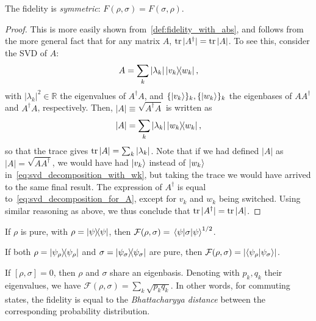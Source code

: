 \documentclass[12pt]{report}
\newcommand{\RR}{\mathbb{R}}
\newcommand{\calF}{{\mathcal{F}}}
\begin{document}
\begin{prop}
	The fidelity is \emph{symmetric}: $F(\rho,\sigma)=F(\sigma,\rho)$.
\end{prop}
\begin{proof}
	This is more easily shown from~\cref{def:fidelity_with_abs}, and follows from the more general fact that for any matrix $A$, $\tr|A^\dagger|=\tr|A|$.
	To see this, consider the \ac{SVD} of $A$:
	\begin{equation}
		A = \sum_k |\lambda_k| \ketbra{v_k}{w_k},
		\label{eq:svd_decomposition_for_A}
	\end{equation}
	with $|\lambda_k|^2\in\RR$ the eigenvalues of $A^\dagger A$, and $\{\ket{v_k}\}_k,\{\ket{w_k}\}_k$ the eigenbases of $AA^\dagger$ and $A^\dagger A$, respectively.
	Then, $|A|\equiv\sqrt{A^\dagger A}$ is written as
	\begin{equation}
		|A| = \sum_k |\lambda_k| \ketbra{w_k}{w_k},
		\label{eq:svd_decomposition_with_wk}
	\end{equation}
	so that the trace gives $\tr|A| = \sum_k |\lambda_k|$.
	Note that if we had defined $|A|$ as $|A|=\sqrt{AA^\dagger}$, we would have had $\ket{v_k}$ instead of $\ket{w_k}$ in~\cref{eq:svd_decomposition_with_wk}, but taking the trace we would have arrived to the same final result.
	The expression of $A^\dagger$ is equal to~\cref{eq:svd_decomposition_for_A}, except for $v_k$ and $w_k$ being switched. Using similar reasoning as above, we thus conclude that $\tr|A^\dagger|=\tr|A|$.
\end{proof}

\begin{prop}
	If $\rho$ is pure, with $\rho=\ketbra\psi$, then
	$\calF(\rho,\sigma)=\mel{\psi}{\sigma}{\psi}^{1/2}$.
\end{prop}

\begin{prop}
	If both $\rho=\ketbra{\psi_\rho}$ and $\sigma=\ketbra{\psi_\sigma}$ are pure, then
	$\calF(\rho,\sigma)=\lvert\braket{\psi_\rho}{\psi_\sigma}\rvert$.
\end{prop}

\begin{prop}
	If $[\rho,\sigma]=0$, then $\rho$ and $\sigma$ share an eigenbasis. Denoting with $p_k, q_k$ their eigenvalues, we have $\calF(\rho,\sigma)=\sum_k\sqrt{p_k q_k}$.
	In other words, for commuting states, the fidelity is equal to the \emph{Bhattacharyya distance} between the corresponding probability distribution.
\end{prop}
\end{document}
